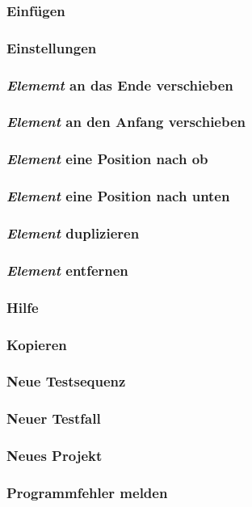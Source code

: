 \documentclass[a4paper,10pt]{scrartcl}
\begin{document}
\subsubsection{Einfügen}
\subsubsection{Einstellungen}
\subsubsection{\textit{Elememt} an das Ende verschieben}
\subsubsection{\textit{Element} an den Anfang verschieben}
\subsubsection{\textit{Element} eine Position nach ob}
\subsubsection{\textit{Element} eine Position nach unten}
\subsubsection{\textit{Element} duplizieren}
\subsubsection{\textit{Element} entfernen}
\subsubsection{Hilfe}
\subsubsection{Kopieren}
\subsubsection{Neue Testsequenz}
\subsubsection{Neuer Testfall}
\subsubsection{Neues Projekt}
\subsubsection{Programmfehler melden}
\end{document}
